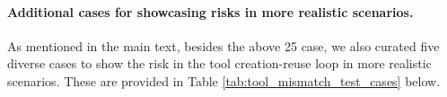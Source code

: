\documentclass{article} %
\begin{document}



\paragraph{Additional cases for showcasing risks in more realistic scenarios.} As mentioned in the main text, besides the above 25 case, we also curated five diverse cases to show the risk in the tool creation-reuse loop in more realistic scenarios. These are provided in Table \ref{tab:tool_mismatch_test_cases} below.

\begin{table}[h]
    \small %
    \centering
    \caption{Manually curated cases for showcasing risks in more realistic scenarios.} %
    \label{tab:tool_mismatch_test_cases} %


\end{table}
\end{document}
